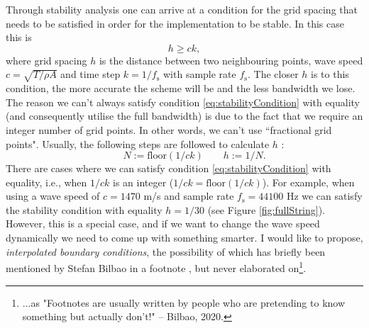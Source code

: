 \documentclass[dvipsnames]{article}
\begin{document}
Through stability analysis one can arrive at a condition for the grid spacing that needs to be satisfied in order for the implementation to be stable. In this case this is
\begin{equation}\label{eq:stabilityCondition}
    h \geq ck,
\end{equation}
where grid spacing $h$ is the distance between two neighbouring points, wave speed $c = \sqrt{T/\rho A}$ and time step $k = 1/f_\text{s}$ with sample rate $f_\text{s}$. The closer $h$ is to this condition, the more accurate the scheme will be and the less bandwidth we lose. The reason we can't always satisfy condition \eqref{eq:stabilityCondition} with equality (and consequently utilise the full bandwidth) is due to the fact that we require an integer number of grid points. In other words, we can't use ``fractional grid points". Usually, the following steps are followed to calculate $h$ \cite[Section 6.2.10]{Bilbao2009}:
\begin{equation}
    \qquad N := \text{floor}(1/ck) \qquad h := 1/N.
\end{equation}
There are cases where we can satisfy condition \eqref{eq:stabilityCondition} with equality, i.e., when $1/ck$ is an integer ($1/ck = \text{floor}(1/ck)$). For example, when using a wave speed of $c = 1470$ m/s and sample rate $f_\text{s} = 44100$ Hz we can satisfy the stability condition with equality $h = 1/30$ (see Figure \ref{fig:fullString}). However, this is a special case, and if we want to change the wave speed dynamically we need to come up with something smarter. I would like to propose, \textit{interpolated boundary conditions}, the possibility of which has briefly been mentioned by Stefan Bilbao in a footnote \cite[p. 145]{Bilbao2009}, but never elaborated on\footnote{...as "Footnotes are usually written by people who are pretending to know something but actually don't!" -- Bilbao, 2020.}. 
\end{document}
